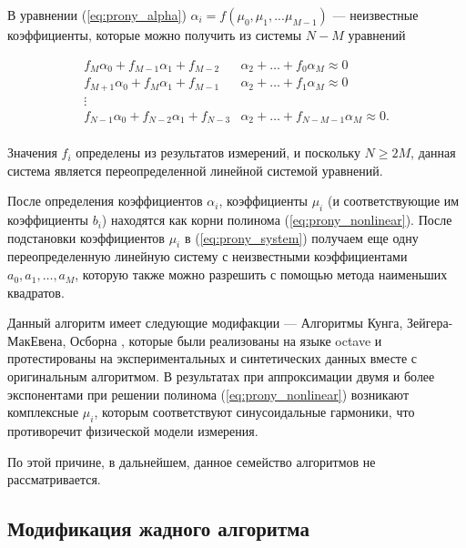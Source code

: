 В уравнении (\ref{eq:prony_alpha})  $\alpha_i = f (\mu_0, \mu_1, ... \mu_{M-1} )$  
--- неизвестные коэффициенты, которые можно получить из системы $ N - M $ уравнений

\begin{equation}
  \begin{split}
  f_M \alpha_0 + f_{M-1} \alpha_1 + f_{M-2} & \alpha_2 + \ldots + f_0 \alpha_M \approx 0  \\
  f_{M+1} \alpha_0 + f_{M} \alpha_1 + f_{M-1} & \alpha_2 + \ldots + f_1 \alpha_M \approx 0 \\
  \vdots & \\
  f_{N-1} \alpha_0 + f_{N-2} \alpha_1 + f_{N-3} & \alpha_2 + \ldots + f_{N-M-1} \alpha_M \approx 0.  \\
  \end{split}
  \label{eq:prony_system2}
\end{equation}

Значения $f_i$ определены из результатов измерений, и поскольку $N \geq 2M$, данная система является переопределенной линейной системой уравнений.


После определения коэффициентов $\alpha_i$, коэффициенты $\mu_i$ (и соответствующие им коэффициенты $b_i$) находятся
 как корни полинома (\ref{eq:prony_nonlinear}). После подстановки коэффициентов $\mu_i$ в (\ref{eq:prony_system}) получаем еще одну переопределенную линейную систему с неизвестными коэффициентами $a_0, a_1, \ldots, a_M$, которую
 также можно разрешить с помощью метода наименьших квадратов.  


Данный алгоритм имеет следующие модифакции --- Алгоритмы Кунга, Зейгера-МакЕвена, Осборна \cite{kung, zeiger, osborn}, которые были реализованы на языке octave и протестированы на экспериментальных и синтетических данных вместе с оригинальным алгоритмом. В результатах при аппроксимации двумя и более экспонентами при решении полинома (\ref{eq:prony_nonlinear}) возникают комплексные $\mu_i$, которым соответствуют синусоидальные гармоники, что противоречит физической модели измерения. 

По этой причине, в дальнейшем, данное семейство алгоритмов не рассматривается.




\subsection{Модификация жадного алгоритма}\label{subsect2_3_4}

